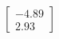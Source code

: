 \documentclass[preview]{standalone}
\begin{document}
\begin{align*}
\begin{bmatrix} -4.89 \\ 2.93 \end{bmatrix}
\end{align*}
\end{document}
